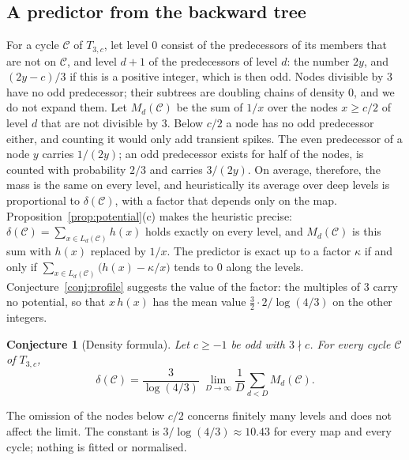 \documentclass[12pt]{amsart}
\newtheorem{conjecture}{Conjecture}
\theoremstyle{definition}
\theoremstyle{remark}
\begin{document}
\subsection*{A predictor from the backward tree}
For a cycle $\mathcal C$ of $T_{3,c}$, let level $0$ consist of the predecessors of its members that are not on $\mathcal C$, and level $d+1$ of the predecessors of level $d$: the number $2y$, and $(2y-c)/3$ if this is a positive integer, which is then odd. Nodes divisible by $3$ have no odd predecessor; their subtrees are doubling chains of density $0$, and we do not expand them. Let $M_d(\mathcal C)$ be the sum of $1/x$ over the nodes $x\ge c/2$ of level $d$ that are not divisible by $3$. Below $c/2$ a node has no odd predecessor either, and counting it would only add transient spikes. The even predecessor of a node $y$ carries $1/(2y)$; an odd predecessor exists for half of the nodes, is counted with probability $2/3$ and carries $3/(2y)$. On average, therefore, the mass is the same on every level, and heuristically its average over deep levels is proportional to $\delta(\mathcal C)$, with a factor that depends only on the map. Proposition~\ref{prop:potential}(c) makes the heuristic precise: $\delta(\mathcal C)=\sum_{x\in L_d(\mathcal C)}h(x)$ holds exactly on every level, and $M_d(\mathcal C)$ is this sum with $h(x)$ replaced by $1/x$. The predictor is exact up to a factor $\kappa$ if and only if $\sum_{x\in L_d(\mathcal C)}\bigl(h(x)-\kappa/x\bigr)$ tends to $0$ along the levels. Conjecture~\ref{conj:profile} suggests the value of the factor: the multiples of $3$ carry no potential, so that $x\,h(x)$ has the mean value $\tfrac32\cdot2/\log(4/3)$ on the other integers.

\begin{conjecture}[Density formula]
\label{conj:formula}
Let $c\ge-1$ be odd with $3\nmid c$. For every cycle $\mathcal C$ of $T_{3,c}$,
\[
\delta(\mathcal C)=\frac{3}{\log(4/3)}\ \lim_{D\to\infty}\frac1D\sum_{d<D}M_d(\mathcal C).
\]
\end{conjecture}

The omission of the nodes below $c/2$ concerns finitely many levels and does not affect the limit. The constant is $3/\log(4/3)\approx10.43$ for every map and every cycle; nothing is fitted or normalised.
\end{document}
